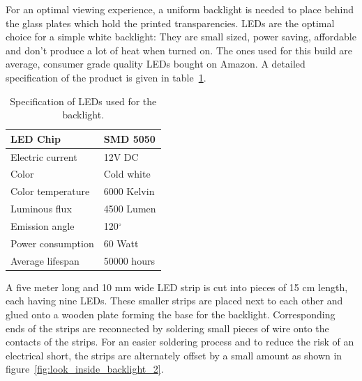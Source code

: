 For an optimal viewing experience, a uniform backlight is needed to place behind the glass plates which hold the printed transparencies.
LEDs are the optimal choice for a simple white backlight: They are small sized, power saving, affordable and don't produce a lot of heat when turned on.
The ones used for this build are average, consumer grade quality LEDs bought on Amazon.
A detailed specification of the product is given in table~\ref{tbl:LED_specs}.
\begin{table}[tb]
	\centering
	\begin{tabular}{| l | l |}
		\hline
		LED Chip					& SMD 5050 \\
		\hline
		Electric current			& 12V DC \\
		\hline
		Color 						& Cold white \\
		\hline 
		Color temperature 			& 6000 Kelvin \\ 
		\hline  
		Luminous flux 				& 4500 Lumen \\ 
		\hline
		Emission angle				& 120$^\circ$ \\
		\hline 
		Power consumption			& 60 Watt \\
		\hline
		Average lifespan			& 50000 hours \\
		\hline
	\end{tabular} 
	\caption[LED specification]
			{Specification of LEDs used for the backlight.}
	\label{tbl:LED_specs}
\end{table}
A five meter long and 10 mm wide LED strip is cut into pieces of 15 cm length, each having nine LEDs.
These smaller strips are placed next to each other and glued onto a wooden plate forming the base for the backlight.
Corresponding ends of the strips are reconnected by soldering small pieces of wire onto the contacts of the strips.
For an easier soldering process and to reduce the risk of an electrical short, the strips are alternately offset by a small amount as shown in figure~\ref{fig:look_inside_backlight_2}.
